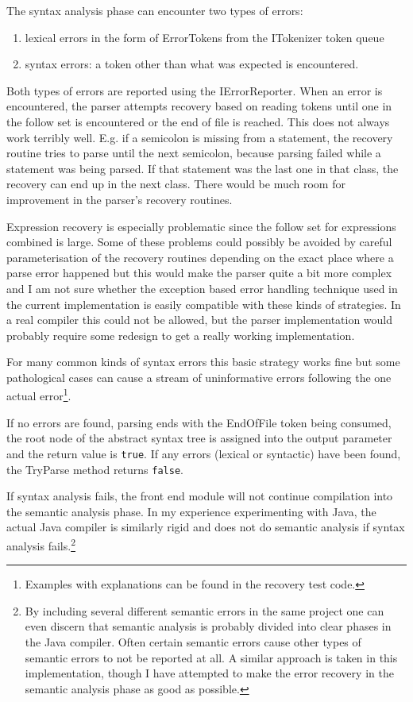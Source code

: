 \documentclass[a4paper,11pt]{article}
\begin{document}
The syntax analysis phase can encounter two types of errors:
\begin{enumerate}
\item lexical errors in the form of ErrorTokens from the ITokenizer token queue
\item syntax errors: a token other than what was expected is encountered.
\end{enumerate}

Both types of errors are reported using the IErrorReporter. When an error is encountered, the parser attempts recovery based on reading tokens until one in the follow set is encountered or the end of file is reached. This does not always work terribly well. E.g. if a semicolon is missing from a statement, the recovery routine tries to parse until the next semicolon, because parsing failed while a statement was being parsed. If that statement was the last one in that class, the recovery can end up in the next class. There would be much room for improvement in the parser's recovery routines.

Expression recovery is especially problematic since the follow set for expressions combined is large. Some of these problems could possibly be avoided by careful parameterisation of the recovery routines depending on the exact place where a parse error happened but this would make the parser quite a bit more complex and I am not sure whether the exception based error handling technique used in the current implementation is easily compatible with these kinds of strategies. In a real compiler this could not be allowed, but the parser implementation would probably require some redesign to get a really working implementation.

For many common kinds of syntax errors this basic strategy works fine but some pathological cases can cause a stream of uninformative errors following the one actual error\footnote{Examples with explanations can be found in the recovery test code.}.

If no errors are found, parsing ends with the EndOfFile token being consumed, the root node of the abstract syntax tree is assigned into the output parameter and the return value is \verb,true,. If any errors (lexical or syntactic) have been found, the TryParse method returns \verb,false,.

If syntax analysis fails, the front end module will not continue compilation into the semantic analysis phase. In my experience experimenting with Java, the actual Java compiler is similarly rigid and does not do semantic analysis if syntax analysis fails.\footnote{By including several different semantic errors in the same project one can even discern that semantic analysis is probably divided into clear phases in the Java compiler. Often certain semantic errors cause other types of semantic errors to not be reported at all. A similar approach is taken in this implementation, though I have attempted to make the error recovery in the semantic analysis phase as good as possible.}
\end{document}
